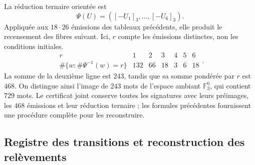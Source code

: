 La réduction ternaire orientée est
\[
 \Psi(U)=([-U_1]_3,\ldots,[-U_6]_3).
\]
Appliquée aux $18\cdot26$ émissions des tableaux précédents,
elle produit le recensement des fibres suivant. Ici, $r$ compte les émissions
distinctes, non les conditions initiales.
\begin{equation}
 \begin{array}{c|rrrrrr}
 r&1&2&3&4&5&6\\ \hline
 \#\{w:\#\Psi^{-1}(w)=r\}&132&66&18&3&6&18
 \end{array}.
 \label{iii:iii:nf-censo-ternario}
\end{equation}
La somme de la deuxième ligne est $243$, tandis que sa somme pondérée
par $r$ est $468$. On distingue ainsi l’image de $243$ mots
de l’espace ambiant $\mathbb F_3^6$, qui contient $729$ mots. Le certificat
joint conserve toutes les signatures avec leurs préimages, les $468$
émissions et leur réduction ternaire ; les formules précédentes fournissent
une procédure complète pour les reconstruire.

\subsection{Registre des transitions et reconstruction des relèvements}

